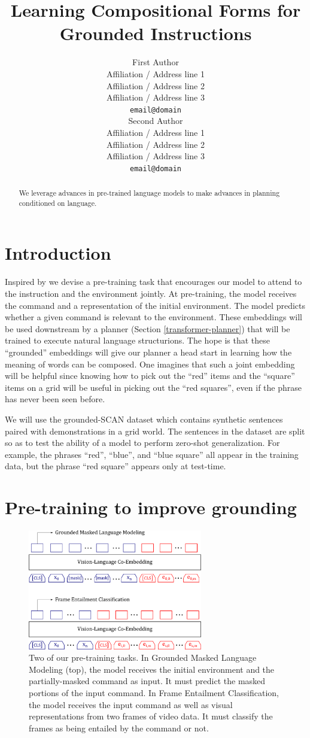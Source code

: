 \documentclass[11pt]{article}
\title{Learning Compositional Forms for Grounded Instructions}
\author{First Author \\
  Affiliation / Address line 1 \\
  Affiliation / Address line 2 \\
  Affiliation / Address line 3 \\
  \texttt{email@domain} \\\And
  Second Author \\
  Affiliation / Address line 1 \\
  Affiliation / Address line 2 \\
  Affiliation / Address line 3 \\
  \texttt{email@domain} \\}
\begin{document}
\maketitle
\begin{abstract}
We leverage advances in pre-trained language models to make advances in planning conditioned on language.
\end{abstract}

\section{Introduction}
Inspired by \cite{Lu2019ViLBERTPT} we devise a pre-training task that encourages our model to attend to the instruction and the environment jointly. 
%
At pre-training, the model receives the command and a representation of the initial environment. 
%
The model predicts whether a given command is relevant to the environment.
%
These embeddings will be used downstream by a planner (Section \ref{transformer-planner}) that will be trained to execute natural language structurions.
%
The hope is that these ``grounded'' embeddings will give our planner a head start in learning how the meaning of words can be composed.
%
One imagines that such a joint embedding will be helpful since knowing how to pick out the ``red'' items and the ``square''  items on a grid will be useful in picking out the ``red squares'', even if the phrase has never been seen before.

We will use the grounded-SCAN dataset \cite{ruis2020benchmark} which contains synthetic sentences paired with demonstrations in a grid world.
%
The sentences in the dataset are split so as to test the ability of a model to perform zero-shot generalization.
%
For example, the phrases ``red'', ``blue'', and ``blue square'' all appear in the training data, but the phrase ``red square'' appears only at test-time.

\section{Pre-training to improve grounding}
\begin{figure}
	\includegraphics[width=3in]{pre_training_model.png}
	\caption{Two of our pre-training tasks. 
	In Grounded Masked Language Modeling (top), the model receives the initial environment and the partially-masked command as input.
	It must predict the masked portions of the input command.
	In Frame Entailment Classification, the model receives the input command as well as visual representations from two frames of video data. 
	It must classify the frames as being entailed by the command or not.
}
	\label{fig:pre_training}	
\end{figure}
\end{document}
